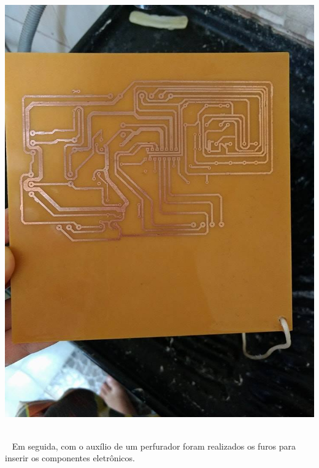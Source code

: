 \begin{center}
    \includegraphics[scale=0.3]{figuras/pronta}
       \label{pronta}
  \end{center}  
Em seguida, com o auxílio de um perfurador foram realizados os furos para inserir os componentes eletrônicos. 
